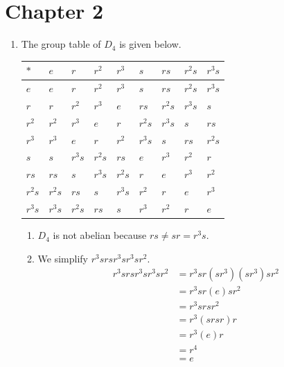 \section*{Chapter 2}
\begin{enumerate}
    \item The group table of $D_4$ is given below.
    \begin{table}[h]
        \centering
        \begin{tabular}{|l|l|l|l|l|l|l|l|l|}
        \hline
        $\ast$ & $e$ & $r$ & $r^2$ & $r^3$ & $s$ & $rs$ & $r^2s$ & $r^3s$ \\ \hline
        $e$ & $e$ & $r$ & $r^2$ & $r^3$ & $s$ & $rs$ & $r^2s$ & $r^3s$ \\ \hline
        $r$ & $r$ & $r^2$ & $r^3$ & $e$ & $rs$ & $r^2s$ & $r^3s$ & $s$ \\ \hline
        $r^2$ & $r^2$ & $r^3$ & $e$ & $r$ & $r^2s$ & $r^3s$ & $s$ & $rs$ \\ \hline
        $r^3$ & $r^3$ & $e$ & $r$ & $r^2$ & $r^3s$ & $s$ & $rs$ & $r^2s$ \\ \hline
        $s$ & $s$ & $r^3s$ & $r^2s$ & $rs$ & $e$ & $r^3$ & $r^2$ & $r$ \\ \hline
        $rs$ & $rs$ & $s$ & $r^3s$ & $r^2s$ & $r$ & $e$ & $r^3$ & $r^2$ \\ \hline
        $r^2s$ & $r^2s$ & $rs$ & $s$ & $r^3s$ & $r^2$ & $r$ & $e$ & $r^3$ \\ \hline
        $r^3s$ & $r^3s$ & $r^2s$ & $rs$ & $s$ & $r^3$ & $r^2$ & $r$ & $e$ \\ \hline
        \end{tabular}
    \end{table}
    \begin{enumerate}[label=(\alph*)]
        \item $D_4$ is not abelian because $rs \neq sr = r^3s$.
        \item We simplify $r^3srsr^3sr^3sr^2$.
        \begin{align*}
            r^3srsr^3sr^3sr^2 &= r^3sr(sr^3)(sr^3)sr^2\\
            &= r^3sr(e)sr^2\\
            &= r^3srsr^2\\
            &= r^3(srsr)r\\
            &= r^3(e)r\\
            &= r^4\\
            &= e
        \end{align*}
    \end{enumerate}


\end{enumerate}
